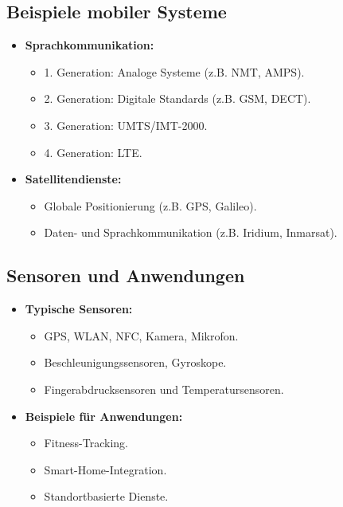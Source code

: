 \documentclass{article}
\begin{document}
\subsection{Beispiele mobiler Systeme}
\begin{itemize}
    \item \textbf{Sprachkommunikation:}
    \begin{itemize}
        \item 1. Generation: Analoge Systeme (z.B. NMT, AMPS).
        \item 2. Generation: Digitale Standards (z.B. GSM, DECT).
        \item 3. Generation: UMTS/IMT-2000.
        \item 4. Generation: LTE.
    \end{itemize}
    \item \textbf{Satellitendienste:}
    \begin{itemize}
        \item Globale Positionierung (z.B. GPS, Galileo).
        \item Daten- und Sprachkommunikation (z.B. Iridium, Inmarsat).
    \end{itemize}
\end{itemize}

\subsection{Sensoren und Anwendungen}
\begin{itemize}
    \item \textbf{Typische Sensoren:}
    \begin{itemize}
        \item GPS, WLAN, NFC, Kamera, Mikrofon.
        \item Beschleunigungssensoren, Gyroskope.
        \item Fingerabdrucksensoren und Temperatursensoren.
    \end{itemize}
    \item \textbf{Beispiele für Anwendungen:}
    \begin{itemize}
        \item Fitness-Tracking.
        \item Smart-Home-Integration.
        \item Standortbasierte Dienste.
    \end{itemize}
\end{itemize}



\end{document}
